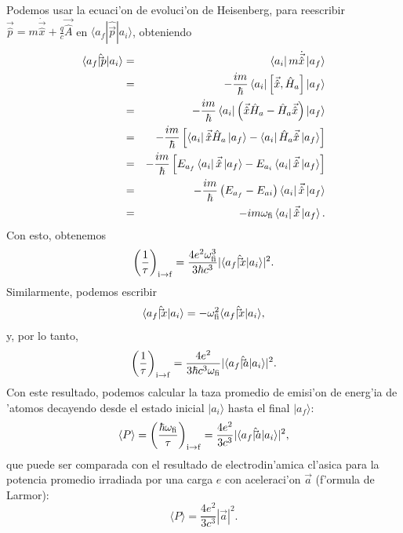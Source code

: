 Podemos usar la ecuaci'on de evoluci'on de Heisenberg, para reescribir
$\vec{\hat{p}}=m\dot{\vec{\hat{x}}}+\frac{q}{c}\vec{\hat{A}}$ en $\langle
a_f|{\hat\vec{p}}|a_i\rangle $, obteniendo
\begin{eqnarray}
\langle a_f|{\hat\vec{p}}|a_i\rangle  &=&\left\langle a_i\right| m\dot{\vec
{\hat{x}}}\left| a_f\right\rangle \\
& = & -\frac{im}{\hbar}\left\langle a_i\right|\left[ \vec{\hat{x}},\hat{H}%
_{a}\right] \left| a_f\right\rangle  \\
& = & -\frac{im}{\hbar}\left\langle a_i\right|
\left(\vec{\hat{x}}\hat{H}_{a}-\hat{H}_{a}\vec{\hat{x}}\right) \left|
a_f\right\rangle  \\
& = &  -\frac{im}{\hbar}\left[ \left\langle a_i\right|
\vec{\hat{x}}\hat{H}_{a}\left| a_f\right\rangle  -\left\langle a_i\right|
\hat{H}_{a}\vec{\hat{x}}\left| a_f\right\rangle \right] \\
& = &  -\frac{im}{\hbar}\left[ E_{a_f}\left\langle a_i\right|
\vec{\hat{x}}\left| a_f\right\rangle  -E_{a_i}\left\langle
a_i\right|\vec{\hat{x}}\left| a_f\right\rangle \right] \\
& = & -\frac{im}{\hbar}\left( E_{a_f}-E_{ai}\right) \left\langle a_i\right|
\vec{\hat{x}}\left| a_f\right\rangle \\
& = & -im\omega_{\rm fi}\left\langle a_i\right| \vec{\hat{x}}\left|
a_f\right\rangle .
\end{eqnarray}
Con esto, obtenemos
\begin{equation}\label{taux}
 \left(\frac{1}{\tau}\right)_{\rm i\rightarrow f}=\frac{4e^2\omega^3_{\rm
fi}}{3\hbar c^3}|\langle a_f|{\hat\vec{x}}|a_i\rangle |^2.
\end{equation} 
Similarmente, podemos escribir
\begin{equation}
 \langle a_f|{\hat\vec{x}}|a_i\rangle =-\omega^2_{\rm fi}\langle 
a_f| {\hat\vec{x}} |a_i\rangle ,
\end{equation} 
y, por lo tanto, 
\begin{equation}
 \left(\frac{1}{\tau}\right)_{\rm i\rightarrow f}=\frac{4e^2}{3\hbar
c^3\omega_{\rm
fi}}|\langle a_f|{\hat\vec{a}}|a_i\rangle |^2.
\end{equation} 
Con este resultado, podemos calcular la taza promedio de emisi'on de energ'ia
de 'atomos decayendo desde el estado inicial $|a_i\rangle $ hasta el final
$|a_f\rangle $:
\begin{equation}
 \langle P\rangle = \left(\frac{\hbar\omega_{\rm fi}}{\tau}\right)_{\rm
i\rightarrow f}=\frac{4e^2}{3c^3}|\langle a_f|{\hat\vec{a}}|a_i\rangle |^2,
\end{equation} 
que puede ser comparada con el resultado de electrodin'amica cl'asica
para la potencia promedio irradiada por una carga $e$ con aceleraci'on
$\vec{a}$ (f'ormula de Larmor):
\begin{equation}
 \langle P\rangle =\frac{4e^2}{3c^3}|\vec{a}|^2.
\end{equation} 


